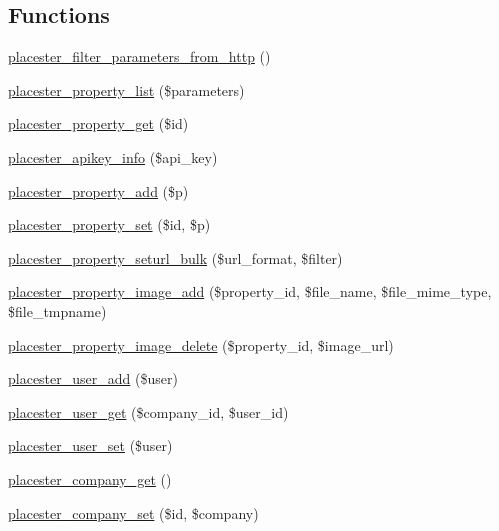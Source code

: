 \subsection*{Functions}
\begin{DoxyCompactItemize}
\item 
\hyperlink{webservice__client_8php_a4dac2b376511b28b302501da10691692}{placester\_\-filter\_\-parameters\_\-from\_\-http} ()
\item 
\hyperlink{webservice__client_8php_a034e50fcf2a00e58c6eda5bec083001b}{placester\_\-property\_\-list} (\$parameters)
\item 
\hyperlink{webservice__client_8php_acb83405ff475a296cde8996ca7afc2af}{placester\_\-property\_\-get} (\$id)
\item 
\hyperlink{webservice__client_8php_ac802bb6318d07dbb5a56fe3d5dd322f1}{placester\_\-apikey\_\-info} (\$api\_\-key)
\item 
\hyperlink{webservice__client_8php_a52c585339de89b11d039ee156cb6e444}{placester\_\-property\_\-add} (\$p)
\item 
\hyperlink{webservice__client_8php_ab6e989651eac645404beaa64514540e8}{placester\_\-property\_\-set} (\$id, \$p)
\item 
\hyperlink{webservice__client_8php_a765df58d12fd63317a4df4663bab3c76}{placester\_\-property\_\-seturl\_\-bulk} (\$url\_\-format, \$filter)
\item 
\hyperlink{webservice__client_8php_a39d60b61d034d2a62df404b29201a0dd}{placester\_\-property\_\-image\_\-add} (\$property\_\-id, \$file\_\-name, \$file\_\-mime\_\-type, \$file\_\-tmpname)
\item 
\hyperlink{webservice__client_8php_ad5ae9b396f019a5e43a34bb6195291b5}{placester\_\-property\_\-image\_\-delete} (\$property\_\-id, \$image\_\-url)
\item 
\hyperlink{webservice__client_8php_a3df4ce9ee6fa0356486b1b691fb56b55}{placester\_\-user\_\-add} (\$user)
\item 
\hyperlink{webservice__client_8php_a8c39b548d2b510e7873c16eef7ca9dbd}{placester\_\-user\_\-get} (\$company\_\-id, \$user\_\-id)
\item 
\hyperlink{webservice__client_8php_aa5c21a56c1b717076d2e5460b29923a4}{placester\_\-user\_\-set} (\$user)
\item 
\hyperlink{webservice__client_8php_a198d88bfc94dd262f87a5f52be135655}{placester\_\-company\_\-get} ()
\item 
\hyperlink{webservice__client_8php_a28ee48b82cd7b89088d620a31a5707c5}{placester\_\-company\_\-set} (\$id, \$company)

\end{DoxyCompactItemize}
